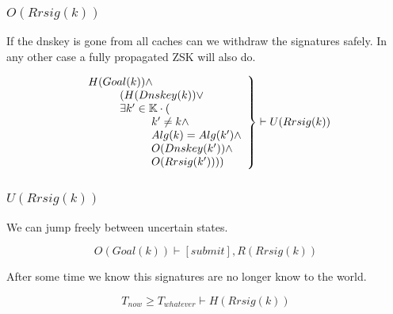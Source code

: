 \documentclass[twoside,english, a4paper]{article}
\newcommand{\mathbox}[1]{#1}
\begin{document}
\subsubsection{$O(Rrsig(k))$}

\mathbox{

	If the dnskey is gone from all caches can we withdraw the 
	signatures safely. In any other case a fully propagated ZSK will 
	also do.

	\begin{equation}
		\left.
		\begin{array}{l}
\hskip 0cm			H(Goal(k)) \wedge  \\
\hskip 1cm			(H(Dnskey(k)) \vee \\
\hskip 1cm			\exists k' \in \mathbb{K} \cdot ( \\
\hskip 2cm				k' \not = k  \wedge\\
\hskip 2cm				Alg(k) = Alg(k')  \wedge\\
\hskip 2cm				O(Dnskey(k'))  \wedge\\
\hskip 2cm				O(Rrsig(k'))))
		\end{array}
		\right\} \vdash U(Rrsig(k))
	\end{equation}
}

\subsubsection{$U(Rrsig(k))$}

\mathbox{

	We can jump freely between uncertain states.

	\begin{equation}
		O(Goal(k)) \vdash [submit], R(Rrsig(k))
	\end{equation}

	After some time we know this signatures are no longer know to the
	world.
	
	\begin{equation}
		T_{now} \geq T_{whatever} \vdash H(Rrsig(k))
	\end{equation}
}
\end{document}
